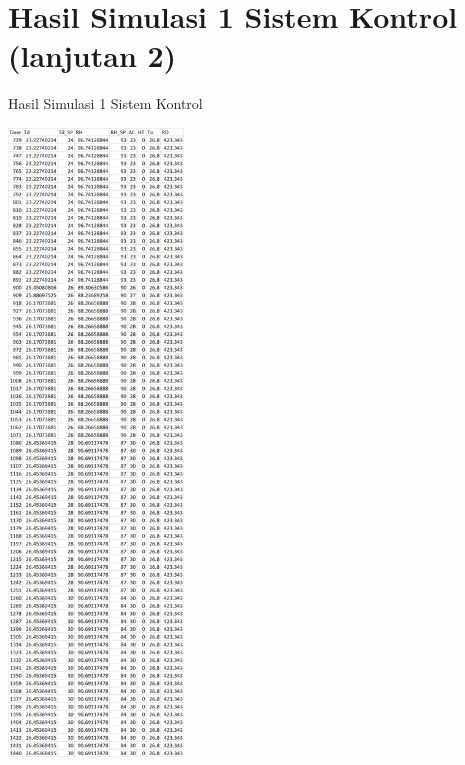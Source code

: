 \section{Hasil Simulasi 1 Sistem Kontrol (lanjutan 2)}
\begin{table}[!h]
	\caption{Hasil Simulasi 1 Sistem Kontrol}
	\label{tbl:A:HasilSimulasiKontrol2}
	\centering
	\includegraphics[width=0.35\textwidth]{figures/HasilSimulasiSimulink2}
\end{table}
\break

